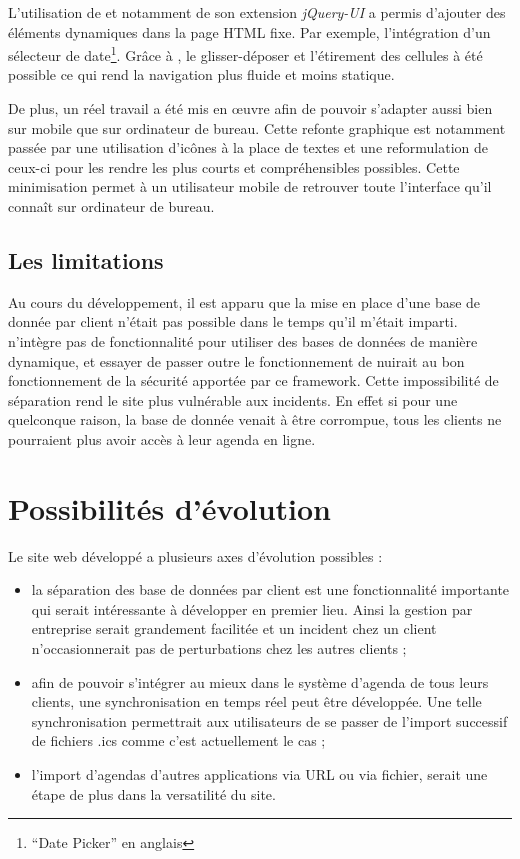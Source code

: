 \documentclass[a4paper, 11pt]{report}
\begin{document}
    L'utilisation de \jq\cite{jquery} et notamment de son extension \textit{jQuery-UI} a permis d'ajouter des éléments dynamiques dans la page HTML fixe. Par exemple, l'intégration d'un sélecteur de date\footnote{``Date Picker'' en anglais}. Grâce à \jq, le glisser-déposer et l'étirement des cellules à été possible ce qui rend la navigation plus fluide et moins statique.

    De plus, un réel travail a été mis en œuvre afin de pouvoir s'adapter aussi bien sur mobile que sur ordinateur de bureau. Cette refonte graphique est notamment passée par une utilisation d’icônes à la place de textes et une reformulation de ceux-ci pour les rendre les plus courts et compréhensibles possibles. Cette minimisation permet à un utilisateur mobile de retrouver toute l'interface qu'il connaît sur ordinateur de bureau.

    \subsection{Les limitations}
    Au cours du développement, il est apparu que la mise en place d'une base de donnée par client n'était pas possible dans le temps qu'il m'était imparti. \symfony n'intègre pas de fonctionnalité pour utiliser des bases de données de manière dynamique, et essayer de passer outre le fonctionnement de \symfony nuirait au bon fonctionnement de la sécurité apportée par ce framework. Cette impossibilité de séparation rend le site plus vulnérable aux incidents. En effet si pour une quelconque raison, la base de donnée venait à être corrompue, tous les clients ne pourraient plus avoir accès à leur agenda en ligne.

\section{Possibilités d'évolution}
    Le site web développé a plusieurs axes d'évolution possibles :

    \begin{itemize}
        \item la séparation des base de données par client est une fonctionnalité importante qui serait intéressante à développer en premier lieu. Ainsi la gestion par entreprise serait grandement facilitée et un incident chez un client n’occasionnerait pas de perturbations chez les autres clients ;
        \item afin de pouvoir s'intégrer au mieux dans le système d'agenda de tous leurs clients, une synchronisation en temps réel peut être développée. Une telle synchronisation permettrait aux utilisateurs de se passer de l'import successif de fichiers .ics comme c'est actuellement le cas ;
        \item l'import d'agendas d'autres applications via URL ou via fichier, serait une étape de plus dans la versatilité du site.
    \end{itemize}
\end{document}
